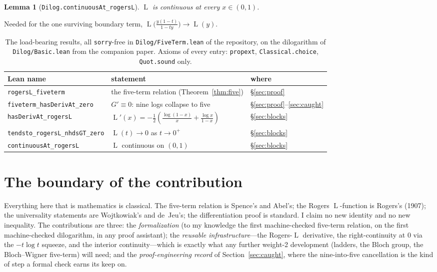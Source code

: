 \documentclass[11pt]{article}
\newtheorem{lemma}{Lemma}
\newcommand{\lean}[1]{\texttt{#1}}
\DeclareMathOperator{\Lrog}{L}
\begin{document}
\begin{lemma}[\lean{Dilog.continuousAt\_rogersL}]
$\Lrog$ is continuous at every $x\in(0,1)$.
\end{lemma}
Needed for the one surviving boundary term, $\Lrog\big(\tfrac{y(1-t)}{1-ty}\big)\to
\Lrog(y)$.

\begin{table}[h]
\centering\small
{}
\begin{tabular}{@{}lll@{}}
\toprule
\rowcolor{ggteal!18} Lean name & statement & where \\
\midrule
\lean{rogersL\_fiveterm} & the five-term relation (Theorem~\ref{thm:five}) & \S\ref{sec:proof} \\
\lean{fiveterm\_hasDerivAt\_zero} & $G'\equiv0$: nine logs collapse to five & \S\ref{sec:proof}--\ref{sec:caught} \\
\lean{hasDerivAt\_rogersL} & $\Lrog'(x)=-\tfrac12(\tfrac{\log(1-x)}{x}+\tfrac{\log x}{1-x})$ & \S\ref{sec:blocks} \\
\lean{tendsto\_rogersL\_nhdsGT\_zero} & $\Lrog(t)\to0$ as $t\to0^+$ & \S\ref{sec:blocks} \\
\lean{continuousAt\_rogersL} & $\Lrog$ continuous on $(0,1)$ & \S\ref{sec:blocks} \\
\bottomrule
\end{tabular}
\caption{The load-bearing results, all \lean{sorry}-free in \lean{Dilog/FiveTerm.lean} of
the repository, on the dilogarithm of \lean{Dilog/Basic.lean} from the companion paper.
Axioms of every entry: \lean{propext}, \lean{Classical.choice}, \lean{Quot.sound} only.}
\label{tab:inventory}
\end{table}

\section{The boundary of the contribution}\label{sec:boundary}

Everything here that is mathematics is classical. The five-term relation is Spence's and
Abel's; the Rogers $\Lrog$-function is Rogers's (1907); the universality statements are
Wojtkowiak's and de~Jeu's; the differentiation proof is standard. I claim no new identity
and no new inequality. The contributions are three: the \emph{formalization} (to my
knowledge the first machine-checked five-term relation, on the first machine-checked
dilogarithm, in any proof assistant); the \emph{reusable infrastructure}---the
Rogers-$\Lrog$ derivative, the right-continuity at $0$ via the $-t\log t$ squeeze, and the
interior continuity---which is exactly what any further weight-2 development (ladders, the
Bloch group, the Bloch--Wigner five-term) will need; and the \emph{proof-engineering record}
of Section~\ref{sec:caught}, where the nine-into-five cancellation is the kind of step a
formal check earns its keep on.
\end{document}
